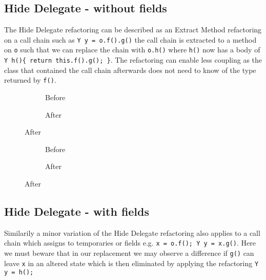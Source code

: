 \subsection{Hide Delegate - without fields}

The Hide Delegate refactoring can be described as an Extract Method refactoring on a call chain such as \lstinline[style=smallJava]|Y y = o.f().g()|
the call chain is extracted to a method on \lstinline[style=smallJava]|o| such that we can replace the chain with \lstinline[style=smallJava]|o.h()|
where \lstinline[style=smallJava]|h()| now has a body of \lstinline[style=smallJava]|Y h(){ return this.f().g(); }|. The refactoring can enable less
coupling as the class that contained the call chain afterwards does not need to know of the type returned by \lstinline[style=smallJava]|f()|.

\begin{figure}
  \centering
  \begin{subfigure}{.4\linewidth}
    
    \caption{Before}
  \end{subfigure}\hspace{1cm}
  \begin{subfigure}{.4\linewidth}
    
    \caption{After}
  \end{subfigure}
\label{lst:HideDelegate-refinity}
\end{figure}

\begin{figure}
  \centering
  \begin{subfigure}{.4\linewidth}
    
    \caption{Before}
  \end{subfigure}\hspace{1cm}
  \begin{subfigure}{.4\linewidth}
    
    \caption{After}
  \end{subfigure}
\label{lst:HideDelegate-refinity}
\end{figure}

\subsection{Hide Delegate - with fields}

Similarily a minor variation of the  Hide Delegate refactoring also applies to a call chain which assigns to temporaries or fields
e.g. \lstinline[style=smallJava]|x = o.f(); Y y = x.g()|. Here we must beware that in our replacement we may observe a difference
if \lstinline[style=smallJava]|g()| can leave \lstinline[style=smallJava]|x| in an altered state which is then eliminated by applying
the refactoring \lstinline[style=smallJava]|Y y = h();|



